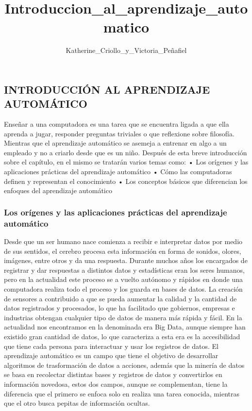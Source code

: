 \documentclass[
  letterpaper,
  DIV=11,
  numbers=noendperiod]{scrartcl}
\title{Introduccion\_al\_aprendizaje\_automatico}
\author{Katherine\_Criollo\_y\_Victoria\_Peñafiel}
\date{}
\begin{document}
\maketitle
\ifdefined\Shaded\renewenvironment{Shaded}{\begin{tcolorbox}[borderline west={3pt}{0pt}{shadecolor}, interior hidden, breakable, sharp corners, enhanced, boxrule=0pt, frame hidden]}{\end{tcolorbox}}\fi

\hypertarget{introducciuxf3n-al-aprendizaje-automuxe1tico}{%
\subsection{INTRODUCCIÓN AL APRENDIZAJE
AUTOMÁTICO}\label{introducciuxf3n-al-aprendizaje-automuxe1tico}}

Enseñar a una computadora es una tarea que se encuentra ligada a que
ella aprenda a jugar, responder preguntas triviales o que reflexione
sobre filosofía. Mientras que el aprendizaje automático se asemeja a
entrenar en algo a un empleado y no a criarlo desde que es un niño.
Después de esta breve introducción sobre el capítulo, en el mismo se
tratarán varios temas como: • Los orígenes y las aplicaciones prácticas
del aprendizaje automático • Cómo las computadoras definen y representan
el conocimiento • Los conceptos básicos que diferencian los enfoques del
aprendizaje automático

\hypertarget{los-oruxedgenes-y-las-aplicaciones-pruxe1cticas-del-aprendizaje-automuxe1tico}{%
\subsubsection{Los orígenes y las aplicaciones prácticas del aprendizaje
automático}\label{los-oruxedgenes-y-las-aplicaciones-pruxe1cticas-del-aprendizaje-automuxe1tico}}

Desde que un ser humano nace comienza a recibir e interpretar datos por
medio de sus sentidos, el cerebro procesa esta información en forma de
sonidos, olores, imágenes, entre otros y da una respuesta. Durante
muchos años los encargados de registrar y dar respuestas a distintos
datos y estadísticas eran los seres humanos, pero en la actualidad este
proceso se a vuelto autónomo y rápidos en donde una computadora realiza
todo el proceso y los guarda en bases de datos. La creación de sensores
a contribuido a que se pueda aumentar la calidad y la cantidad de datos
registrados y procesados, lo que ha facilitado que gobiernos, empresas e
industrias obtengan cualquier tipo de datos de manera más rápida y
fácil. En la actualidad nos encontramos en la denominada era Big Data,
aunque siempre han existido gran cantidad de datos, lo que caracteriza a
esta era es la accesibilidad que tiene cada persona para interactuar y
usar los registros de datos. El aprendizaje automático es un campo que
tiene el objetivo de desarrollar algoritmos de trasformación de datos a
acciones, además que la minería de datos se basa en recolectar distintas
bases y registros de datos y convertirlos en información novedosa, estos
dos campos, aunque se complementan, tiene la diferencia que el primero
se enfoca solo en realiza una tarea conocida, mientras que el otro busca
pepitas de información ocultas.
\end{document}
